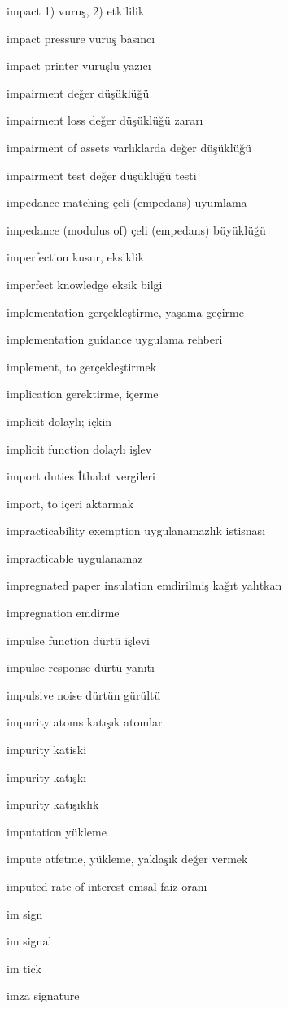 \documentclass[12pt,fleqn]{article}\usepackage{../../common}
\begin{document}
impact 1) vuruş, 2) etkililik

impact pressure vuruş basıncı

impact printer vuruşlu yazıcı

impairment değer düşüklüğü

impairment loss değer düşüklüğü zararı

impairment of assets varlıklarda değer düşüklüğü

impairment test değer düşüklüğü testi

impedance matching çeli (empedans) uyumlama

impedance (modulus of) çeli (empedans) büyüklüğü

imperfection kusur, eksiklik

imperfect knowledge eksik bilgi

implementation gerçekleştirme, yaşama geçirme

implementation guidance uygulama rehberi

implement, to gerçekleştirmek

implication gerektirme, içerme

implicit dolaylı; içkin

implicit function dolaylı işlev

import duties İthalat vergileri

import, to içeri aktarmak

impracticability exemption uygulanamazlık istisnası

impracticable uygulanamaz

impregnated paper insulation emdirilmiş kağıt yalıtkan

impregnation emdirme

impulse function dürtü işlevi

impulse response dürtü yanıtı

impulsive noise dürtün gürültü

impurity atoms katışık atomlar

impurity katiski

impurity katışkı

impurity katışıklık

imputation yükleme

impute atfetme, yükleme, yaklaşık değer vermek

imputed rate of interest emsal faiz oranı

im sign

im signal

im tick

imza signature
\end{document}

